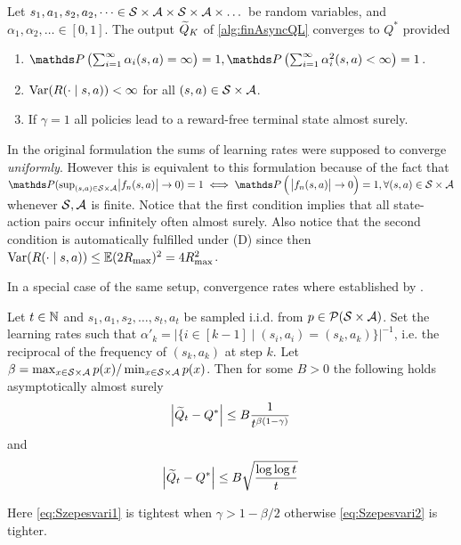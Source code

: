 \begin{thm}
  Let $s_1, a_1, s_2, a_2, \dots \in
  \mathcal{S} \times \mathcal{A} \times \mathcal{S} \times \mathcal{A} \times \dots$
  be random variables, and $\alpha_1, \alpha_2, \dots \in [0,1]$.
  The output $\widetilde{Q}_K$ of \cref{alg:finAsyncQL} converges to $Q^*$
  provided
  \begin{enumerate}
    \item $\Prob\left(\sum_{i=1}^\infty \alpha_i(s,a) = \infty\right) = 1,
      \Prob\left(\sum_{i=1}^\infty \alpha_i^2(s,a) < \infty\right) = 1$.
    \item $\mathrm{Var}(R(\cdot \mid s, a)) < \infty$ for all $(s, a) \in
      \mathcal{S}\times\mathcal{A}$.
    \item If $\gamma = 1$ all policies lead to a reward-free terminal
      state almost surely.
  \end{enumerate}
\end{thm}
In the original formulation the sums of learning rates were supposed to
converge \emph{uniformly}. However this is equivalent to this formulation
because of the fact that
$\Prob(\sup_{(s, a) \in \cl{S} \times \cl{A}} \abs{f_n(s, a)} \to 0) = 1 \iff
\Prob\left(\;\abs{f_n(s, a)} \to 0 \right) = 1,
\forall (s, a) \in \cl{S} \times \cl{A}$
whenever $\mathcal{S}, \mathcal{A}$ is finite.
Notice that the first condition implies that all state-action pairs
occur infinitely often almost surely.
Also notice that the second condition is automatically fulfilled under
(D) since then $\mathrm{Var}(R(\cdot \mid s, a)) \leq \mathbb{E} (2R_{\max})^2 = 4 R_{\max}^2$.

In a special case of the same setup, convergence rates where
established by .
\begin{thm}[Szepesvári]
  Let $t \in \mathbb{N}$ and
  $s_1, a_1, s_2, \dots, s_t, a_t$ be sampled i.i.d. from
  $p \in \mathcal{P}(\mathcal{S} \times \mathcal{A})$.
  Set the learning rates such that
  $\alpha'_k
  = |\{ i \in [k-1] \mid (s_i, a_i) = (s_k, a_k) \}|^{-1}$,
  i.e. the reciprocal of the frequency of $(s_k, a_k)$ at step $k$.
  Let $\beta = \max_{x \in \mathcal{S} \times \mathcal{A}} p(x) /
  \min_{x \in \mathcal{S} \times \mathcal{A}} p(x)$.
  Then for some $B > 0$ the following holds asymptotically almost surely
  \begin{equation}
    \abs{\widetilde{Q}_t - Q^*} \leq B \frac{1}{t^{\beta (1-\gamma)}}
    \label{eq:Szepesvari1}
  \end{equation}
  and
  \begin{equation}
    \abs{\widetilde{Q}_t - Q^*} \leq B \sqrt{\frac{\log \log t}{t}}
    \label{eq:Szepesvari2}
  \end{equation}
\end{thm}
Here \cref{eq:Szepesvari1} is tightest when $\gamma > 1 - \beta/2$
otherwise \cref{eq:Szepesvari2} is tighter.

